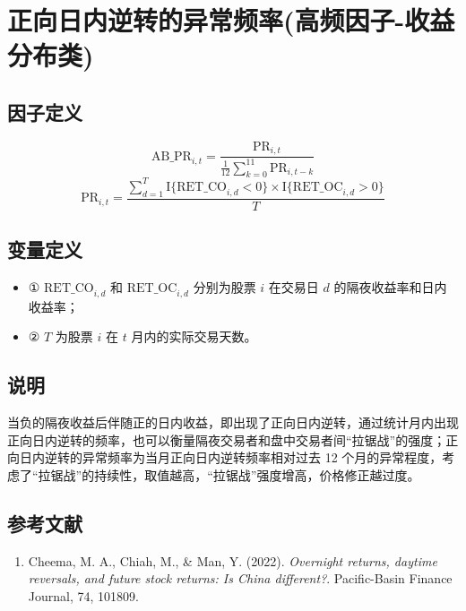 \documentclass{article}
\begin{document}
\section{正向日内逆转的异常频率(高频因子-收益分布类)}

\subsection{因子定义}

\begin{equation}
    \mathrm{AB\_PR}_{i,t} = \frac{\mathrm{PR}_{i,t}}{\frac{1}{12} \sum_{k=0}^{11} \mathrm{PR}_{i,t-k}}
\end{equation}
\begin{equation}
    \mathrm{PR}_{i,t} = \frac{\sum_{d=1}^{T} \mathrm{I}\{\mathrm{RET\_CO}_{i,d}<0\} \times \mathrm{I}\{\mathrm{RET\_OC}_{i,d}>0\}}{T}
\end{equation}

\subsection{变量定义}
\begin{itemize}
    \item ① \( \mathrm{RET\_CO}_{i,d} \) 和 \( \mathrm{RET\_OC}_{i,d} \) 分别为股票 \( i \) 在交易日 \( d \) 的隔夜收益率和日内收益率；
    \item ② \( T \) 为股票 \( i \) 在 \( t \) 月内的实际交易天数。
\end{itemize}

\subsection{说明}
当负的隔夜收益后伴随正的日内收益，即出现了正向日内逆转，通过统计月内出现正向日内逆转的频率，也可以衡量隔夜交易者和盘中交易者间“拉锯战”的强度；正向日内逆转的异常频率为当月正向日内逆转频率相对过去 12 个月的异常程度，考虑了“拉锯战”的持续性，取值越高，“拉锯战”强度增高，价格修正越过度。

\subsection{参考文献}
\begin{enumerate}
    \item Cheema, M. A., Chiah, M., \& Man, Y. (2022). \textit{Overnight returns, daytime reversals, and future stock returns: Is China different?}. Pacific-Basin Finance Journal, 74, 101809.
\end{enumerate}
\end{document}
